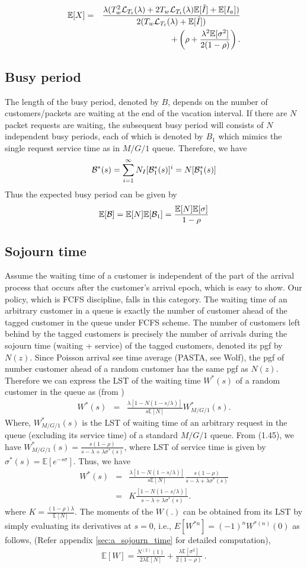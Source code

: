 \documentclass[journal]{IEEEtran}
\newcommand {\bear} {\begin{eqnarray}}
\newcommand {\eear} {\end{eqnarray}}
\newcommand {\bears} {\begin{eqnarray*}}
\newcommand {\eears} {\end{eqnarray*}}
\def \E{{\mathbb E}}
\begin{document}
\bear
\label{e:EX}
\E[X]&=&\frac{\lambda(T_w^2{\cal L}_{T_t}(\lambda)+2T_w{\cal L}_{T_t}(\lambda)\E[\tilde{I}]+\E[I_a])}{2(T_w{\cal L}_{T_t}(\lambda)+\E[\tilde{I}])}
\nonumber\\
&&+\left(\rho+\frac{\lambda^2\E[\sigma^2]}{2(1-\rho)}\right) .
\eear

\subsection{Busy period}
The length of the busy period, denoted by $B$, depends on the number of customers/packets are waiting at the end of the vacation interval. If there are $N$ packet requests are waiting, the subsequent busy period will consists of $N$ independent busy periods, each of which is denoted by $B_1$ which mimics the single request service time as in $M/G/1$ queue. Therefore, we have 
\bears
{\cal B}^*(s)= \sum_{i=1}^\infty N_I[{\cal B}_1^*(s)]^i=N[{\cal B}_1^*(s)]
\eears
Thus the expected busy period can be given by
\bear
\E[{\cal B}]=\E[N]\E[{\cal B}_1]=\frac{\E[N]\E[\sigma]}{1-\rho}
\eear
\subsection{Sojourn time}
Assume the waiting time of a customer is independent of the part of the arrival process that occurs after the customer's arrival epoch, which is easy to show. Our policy, which is FCFS discipline, falls in this category. The waiting time of an arbitrary customer in a queue is exactly the number of customer ahead of the tagged customer in the queue under FCFS scheme. The number of customers left behind by the tagged customers is precisely the number of arrivals during the sojourn time (waiting + service) of the tagged customers, denoted its pgf by $N(z)$. Since Poisson arrival see time average (PASTA, see Wolf), the pgf of number customer ahead of a random customer has the same pgf as $N(z)$. Therefore we can express the LST of the waiting time $W^*(s)$ of a random customer in the queue as (from \cite{Fuhrmann_Copper_1985}) 
\bear
W^*(s)&=& \frac{\lambda[1-N(1-s/\lambda)]}{s \E[N]} W^*_{M/G/1}(s).
\eear
Where, $W^*_{M/G/1}(s)$ is the LST of waiting time of an arbitrary request in the queue (excluding its service time) of a standard $M/G/1$ queue. From \cite{Takagi}(1.45), we have
$W^*_{M/G/1}(s)=\frac{s(1-\rho)}{s-\lambda+\lambda \sigma^*(s)}$, where
LST of service time is given by $\sigma^*(s)=\E[e^{-s\sigma}]$.
Thus, we have
\bear
\nonumber
W^*(s)&=& \frac{\lambda[1-N(1-s/\lambda)]}{s \E[N]} \frac{s(1-\rho)}{s-\lambda+\lambda \sigma^*(s)}\\
\label{e:Ws}&=& K \frac{[1-N(1-s/\lambda)]}{s-\lambda+\lambda \sigma^*(s)}.
\eear
where $K=\frac{(1-\rho)\lambda}{\E[N]}$.
The moments of the $W(.)$ can be obtained from its LST by simply evaluating its derivatives at $s=0$, i.e., $E[W^{*n}]=(-1)^nW^{*{(n)}}(0)$ as follows, (Refer appendix \ref{sec:a_sojourn_time} for detailed computation),
\bear
\E[W]=\frac{{N^{(2)}}(1)}{2\lambda\E[N]}+ \frac{\lambda\E[\sigma^2]}{2(1-\rho)}~.
\eear
\end{document}
